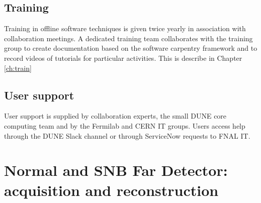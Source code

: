 \documentclass[../main-v1.tex]{subfiles}
\begin{document}
\subsection{Training}
Training in offline software techniques is given twice yearly in association with  collaboration meetings.  A dedicated training team collaborates with the  training group to create documentation based on the software carpentry framework and to record videos of tutorials for particular activities. This is describe in Chapter \ref{ch:train}

\subsection{User support}
User support is supplied by collaboration experts, the small DUNE core computing team and by the Fermilab and CERN IT groups. 
Users access help through the DUNE Slack channel or through ServiceNow requests to FNAL IT. 





\pagebreak





\section{Normal  and SNB Far Detector: acquisition and reconstruction  }
\label{sec:use:fdbeam}  %
\end{document}
